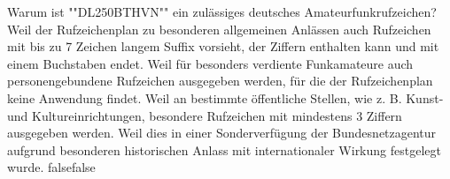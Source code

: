     {Warum ist ""DL250BTHVN"" ein zulässiges deutsches Amateurfunkrufzeichen?}
    {Weil der Rufzeichenplan zu besonderen allgemeinen Anlässen auch Rufzeichen mit bis zu 7 Zeichen langem Suffix vorsieht, der Ziffern enthalten kann und mit einem Buchstaben endet.}
    {Weil für besonders verdiente Funkamateure auch personengebundene Rufzeichen ausgegeben werden, für die der Rufzeichenplan keine Anwendung findet.}
    {Weil an bestimmte öffentliche Stellen, wie z. B. Kunst- und Kultureinrichtungen, besondere Rufzeichen mit mindestens 3 Ziffern ausgegeben werden.}
    {Weil dies in einer Sonderverfügung der Bundesnetzagentur aufgrund besonderen historischen Anlass mit internationaler Wirkung festgelegt wurde.}
    {false}{false}